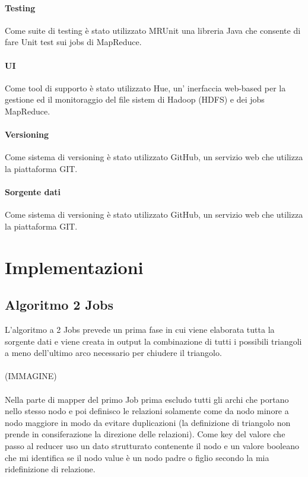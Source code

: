\documentclass[paper=a4, fontsize=11pt]{scrartcl}	%
\numberwithin{equation}{section}															%
\numberwithin{figure}{section}																%
\numberwithin{table}{section}																%
\begin{document}
\paragraph{Testing}
Come suite di testing \`e stato utilizzato MRUnit una libreria Java che consente di fare Unit test sui jobs di MapReduce.
\paragraph{UI}
Come tool di supporto \`e stato utilizzato Hue, un' inerfaccia web-based per la gestione ed il monitoraggio del file sistem di Hadoop (HDFS) e dei jobs MapReduce.
\paragraph{Versioning}
Come sistema di versioning \`e stato utilizzato GitHub, un servizio web che utilizza la piattaforma GIT.
\paragraph{Sorgente dati}
Come sistema di versioning \`e stato utilizzato GitHub, un servizio web che utilizza la piattaforma GIT.




\section{Implementazioni}
\subsection{Algoritmo 2 Jobs}
L'algoritmo a 2 Jobs prevede un prima fase in cui viene elaborata tutta la sorgente dati e viene creata in output la combinazione di tutti i possibili triangoli a meno dell'ultimo arco necessario per chiudere il triangolo.\\
\\
(IMMAGINE)\\
\\
Nella parte di mapper del primo Job prima escludo tutti gli archi che portano nello stesso nodo e poi definisco le relazioni solamente come da nodo minore a nodo maggiore in modo da evitare duplicazioni (la definizione di triangolo non prende in consiferazione la direzione delle relazioni). Come key del valore che passo al reducer uso un dato strutturato contenente il nodo e un valore booleano che mi identifica se il nodo value è un nodo padre o figlio secondo la mia ridefinizione di relazione.
\end{document}
